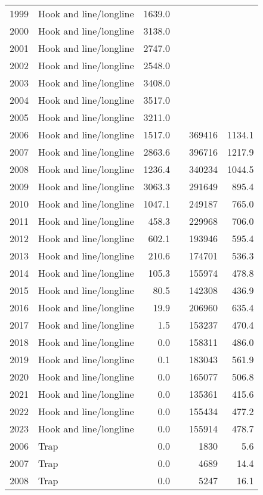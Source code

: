 \begin{longtable}[t]{llrrrr}
1999 & Hook and line/longline & 1639.0 &  &  & \\
2000 & Hook and line/longline & 3138.0 &  &  & \\
2001 & Hook and line/longline & 2747.0 &  &  & \\
2002 & Hook and line/longline & 2548.0 &  &  & \\
2003 & Hook and line/longline & 3408.0 &  &  & \\
2004 & Hook and line/longline & 3517.0 &  &  & \\
2005 & Hook and line/longline & 3211.0 &  &  & \\
2006 & Hook and line/longline & 1517.0 &  & 369416 & 1134.1\\
2007 & Hook and line/longline & 2863.6 &  & 396716 & 1217.9\\
2008 & Hook and line/longline & 1236.4 &  & 340234 & 1044.5\\
2009 & Hook and line/longline & 3063.3 &  & 291649 & 895.4\\
2010 & Hook and line/longline & 1047.1 &  & 249187 & 765.0\\
2011 & Hook and line/longline & 458.3 &  & 229968 & 706.0\\
2012 & Hook and line/longline & 602.1 &  & 193946 & 595.4\\
2013 & Hook and line/longline & 210.6 &  & 174701 & 536.3\\
2014 & Hook and line/longline & 105.3 &  & 155974 & 478.8\\
2015 & Hook and line/longline & 80.5 &  & 142308 & 436.9\\
2016 & Hook and line/longline & 19.9 &  & 206960 & 635.4\\
2017 & Hook and line/longline & 1.5 &  & 153237 & 470.4\\
2018 & Hook and line/longline & 0.0 &  & 158311 & 486.0\\
2019 & Hook and line/longline & 0.1 &  & 183043 & 561.9\\
2020 & Hook and line/longline & 0.0 &  & 165077 & 506.8\\
2021 & Hook and line/longline & 0.0 &  & 135361 & 415.6\\
2022 & Hook and line/longline & 0.0 &  & 155434 & 477.2\\
2023 & Hook and line/longline & 0.0 &  & 155914 & 478.7\\
2006 & Trap & 0.0 &  & 1830 & 5.6\\
2007 & Trap & 0.0 &  & 4689 & 14.4\\
2008 & Trap & 0.0 &  & 5247 & 16.1\\

\end{longtable}
